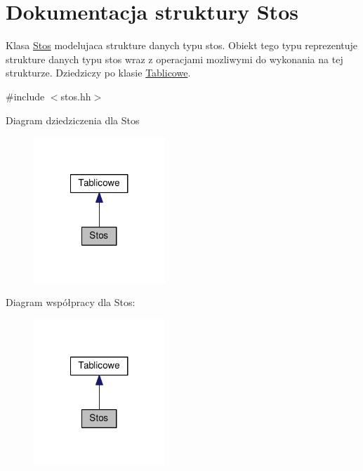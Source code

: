 \hypertarget{struct_stos}{\section{Dokumentacja struktury Stos}
\label{struct_stos}
}


Klasa \hyperlink{struct_stos}{Stos} modelujaca strukture danych typu stos. Obiekt tego typu reprezentuje strukture danych typu stos wraz z operacjami mozliwymi do wykonania na tej strukturze. Dziedziczy po klasie \hyperlink{class_tablicowe}{Tablicowe}.  




{\ttfamily \#include $<$stos.\-hh$>$}



Diagram dziedziczenia dla Stos\nopagebreak
\begin{figure}[H]
\begin{center}
\leavevmode
\includegraphics[width=140pt]{struct_stos__inherit__graph}
\end{center}
\end{figure}


Diagram współpracy dla Stos\-:\nopagebreak
\begin{figure}[H]
\begin{center}
\leavevmode
\includegraphics[width=140pt]{struct_stos__coll__graph}
\end{center}
\end{figure}
